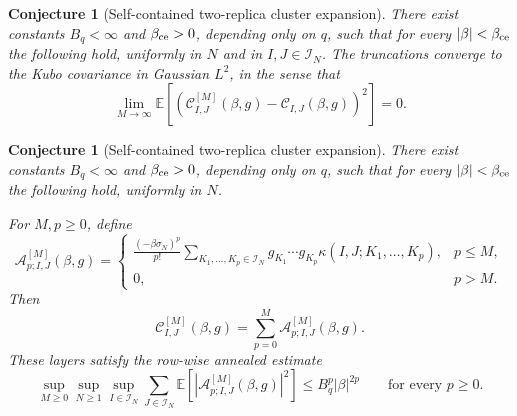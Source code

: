 \documentclass[11pt]{article}
\newtheorem{conjecture}[theorem]{Conjecture}
\newcommand{\E}{\mathbb{E}}
\newcommand{\calI}{\mathcal{I}}
\begin{document}
\begin{conjecture}[Self-contained two-replica cluster expansion]
  \label{conj:self-contained-two-replica-cluster}
  There exist constants $B_q<\infty$ and $\beta_{\rm ce}>0$, depending only on
  $q$, such that for every $|\beta|<\beta_{\rm ce}$ the following hold,
  uniformly in $N$ and in $I,J\in\calI_N$.  The truncations converge to the
  Kubo covariance in Gaussian $L^2$, in the sense that
  \begin{equation}\label{eq:final-conj-convergence}
    \lim_{M\to\infty}
    \E\left[
      \left(
        \mathcal C^{[M]}_{I,J}(\beta,g)
        -
        \mathcal C_{I,J}(\beta,g)
      \right)^2
    \right]
    =
    0.
  \end{equation}
  \end{conjecture}
  \begin{conjecture}[Self-contained two-replica cluster expansion]
  \label{conj:self-contained-two-replica-cluster2}
  There exist constants $B_q<\infty$ and $\beta_{\rm ce}>0$, depending only on
  $q$, such that for every $|\beta|<\beta_{\rm ce}$ the following hold,
  uniformly in $N$.

  For $M,p\geq0$, define
  \begin{equation}\label{eq:final-conj-explicit-layer}
    \mathcal A^{[M]}_{p;I,J}(\beta,g)
    =
    \begin{cases}
    \displaystyle
    \frac{(-\beta\sigma_N)^p}{p!}
    \sum_{K_1,\ldots,K_p\in\calI_N}
    g_{K_1}\cdots g_{K_p}
    \kappa(I,J;K_1,\ldots,K_p),
    & p\leq M,\\[1.2em]
    0,
    & p>M.
    \end{cases}
  \end{equation}
  Then
  \begin{equation}\label{eq:final-conj-layer-decomposition}
    \mathcal C^{[M]}_{I,J}(\beta,g)
    =
    \sum_{p=0}^M
    \mathcal A^{[M]}_{p;I,J}(\beta,g).
  \end{equation}
  These layers
  satisfy the row-wise annealed estimate
  \begin{equation}\label{eq:final-conj-layer-bound}
    \sup_{M\geq0}
    \sup_{N\geq1}
    \sup_{I\in\calI_N}
    \sum_{J\in\calI_N}
    \E\left[
      \left|
        \mathcal A^{[M]}_{p;I,J}(\beta,g)
      \right|^2
    \right]
    \leq
    B_q^p|\beta|^{2p}
    \qquad
    \text{for every }p\geq0.
  \end{equation}
\end{conjecture}
\end{document}
